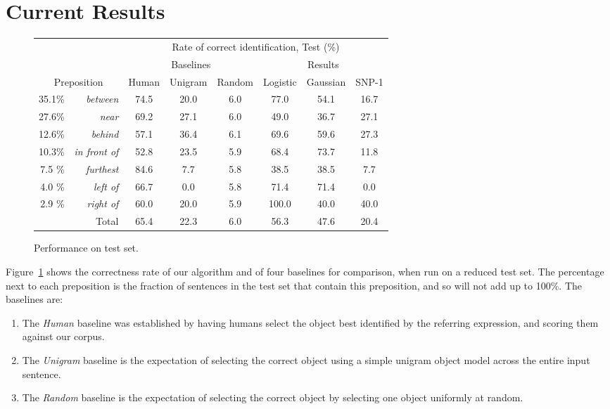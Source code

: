 \documentclass[letterpaper,10pt]{article}
\begin{document}
\section{Current Results}

\begin{figure}[H]
  \centering
  \begin{tabular}{| r r | c | c | c || c c | c |} \hline
     & & \multicolumn{6}{c|}{Rate of correct identification, Test (\%)} \\
     & & \multicolumn{3}{c||}{Baselines} & \multicolumn{3}{c|}{Results} \\
     \multicolumn{2}{|c|}{Preposition}
			                      &   Human & Unigram & Random &  Logistic & Gaussian & SNP-1 \\\hline
     35.1\% & \textit{between}	  &    74.5 &  20.0 &   6.0 & 77.0 & 54.1 &  16.7   \\
     27.6\% & \textit{near} 	  &    69.2 &  27.1 &   6.0 & 49.0 & 36.7 &  27.1   \\
     12.6\% & \textit{behind}     &    57.1 &  36.4 &   6.1 & 69.6 & 59.6 &  27.3   \\
     10.3\% & \textit{in front of}&    52.8 &  23.5 &   5.9 & 68.4 & 73.7 &  11.8   \\
	 7.5 \% & \textit{furthest}   &    84.6 &  7.7  &   5.8 & 38.5 & 38.5 &   7.7   \\          
     4.0 \% & \textit{left of}    &    66.7 &  0.0  &   5.8 & 71.4 & 71.4 &   0.0   \\
	 2.9 \% & \textit{right of}   &    60.0 &  20.0 &   5.9 &100.0 & 40.0 &  40.0   \\     
\hline\hline
     \multicolumn{2}{|r|}{Total}  &    65.4 &  22.3 &  6.0  & 56.3 & 47.6  &  20.4 \\\hline
  \end{tabular}
  \caption{Performance on test set.}
  \label{fig:results}
\end{figure}

Figure~\ref{fig:results} shows the correctness rate of our algorithm and of four baselines for comparison, when run on a reduced test set. The percentage next to each preposition is the fraction of sentences in the test set that contain this preposition, and so will not add up to 100\%. The baselines are:
\begin{enumerate}[topsep=0pt,itemsep=-1ex,partopsep=1ex,parsep=1ex]
	\item The \emph{Human} baseline was established by having humans select the object best identified by the referring expression, and scoring them against our corpus.
	\item The \emph{Unigram} baseline is the expectation of selecting the correct object using a simple unigram object model across the entire input sentence.
	\item The \emph{Random} baseline is the expectation of selecting the correct object by selecting one object uniformly at random.
\end{enumerate}
\end{document}
